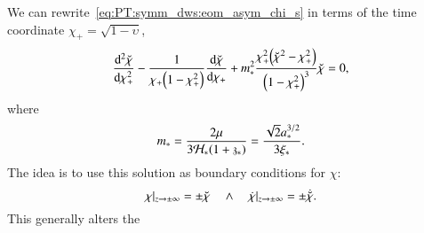 We can rewrite~\cref{eq:PT:symm_dws:eom_asym_chi_s} in terms of the time coordinate $\chi_+ =\sqrt{1-\upsilon}$,
\begin{equation}%
    \dv[2]{\brchi}{\chi_+} - \frac{1}{\chi_+ \pclosed{1-\chi_+^2}} \dv{\brchi}{\chi_+} + m_\ast^2 \frac{\chi_+^2 \pclosed{\brchi^2-\chi_+^2}}{\pclosed{1-\chi_+^2}^3}\brchi = 0,
\end{equation}
where
\begin{equation}%
    m_\ast= \frac{2\mu}{3\mathcal{H}_\ast \pclosed{1+\redshift_\ast}} = \frac{\sqrt{2}a_\ast^{3/2}}{3\xi_\ast}.
\end{equation}
The idea is to use this solution as boundary conditions for $\chi$:
\begin{equation}
    \chi|_{z\to \pm\infty} =\pm \breve{\chi} \quad \land \quad \dot{\chi}|_{z\to \pm\infty} =\pm \dot{\breve{\chi}}.
\end{equation}
This generally alters the \blahblah
{}
